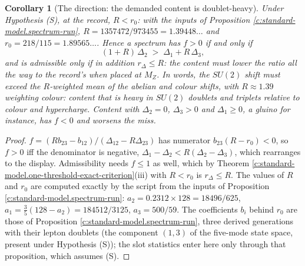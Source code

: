 \documentclass[11pt]{article}
\newtheorem{corollary}[theorem]{Corollary}
\theoremstyle{definition}
\theoremstyle{plain}
\newcommand{\changedmark}[2]{\marginpar{\raggedright\scriptsize\color{#1}#2}}
\providecommand{\Dl}{}\renewcommand{\Dl}{\Delta}
\begin{document}
\begin{corollary}[The direction: the demanded content is doublet-heavy]\label{c:standard-model.direction-demanded-content-doublet-heavy}
\changedmark{BurntOrange}{changed since the deposit}
Under Hypothesis (S), at the record, $R < r_{0}$: with the inputs of Proposition \ref{c:standard-model.spectrum-run}, $R = 1357472/973455 = 1.39448\ldots$ and $r_{0} = 218/115 = 1.89565\ldots$. Hence a spectrum has $f > 0$ if and only if
\[
(1 + R)\,\Dl_{2} \;>\; \Dl_{1} + R\,\Dl_{3},
\]
and is admissible only if in addition $r_{\Dl} \le R$: the content must lower the ratio all the way to the record's when placed at $M_{Z}$. In words, the $SU(2)$ shift must exceed the $R$-weighted mean of the abelian and colour shifts, with $R \approx 1.39$ weighting colour: content that is heavy in $SU(2)$ doublets and triplets relative to colour and hypercharge. Content with $\Dl_{2} = 0$, $\Dl_{3} > 0$ and $\Dl_{1} \ge 0$, a gluino for instance, has $f < 0$ and worsens the miss.
\end{corollary}
\begin{proof}
$f = (Rb_{23} - b_{12})/(\Dl_{12} - R\Dl_{23})$ has numerator $b_{23}(R - r_{0}) < 0$, so $f > 0$ iff the denominator is negative, $\Dl_{1} - \Dl_{2} < R(\Dl_{2} - \Dl_{3})$, which rearranges to the display. Admissibility needs $f \le 1$ as well, which by Theorem \ref{c:standard-model.one-threshold-exact-criterion}(iii) with $R < r_{0}$ is $r_{\Dl} \le R$. The values of $R$ and $r_{0}$ are computed exactly by the script from the inputs of Proposition \ref{c:standard-model.spectrum-run}: $a_{2} = 0.2312 \times 128 = 18496/625$, $a_{1} = \tfrac35(128 - a_{2}) = 184512/3125$, $a_{3} = 500/59$. The coefficients $b_{i}$ behind $r_{0}$ are those of Proposition \ref{c:standard-model.spectrum-run}, three derived generations with their lepton doublets (the component $(1,3)$ of the five-mode state space, present under Hypothesis (S)); the slot statistics enter here only through that proposition, which assumes (S).

\end{proof}
\end{document}
